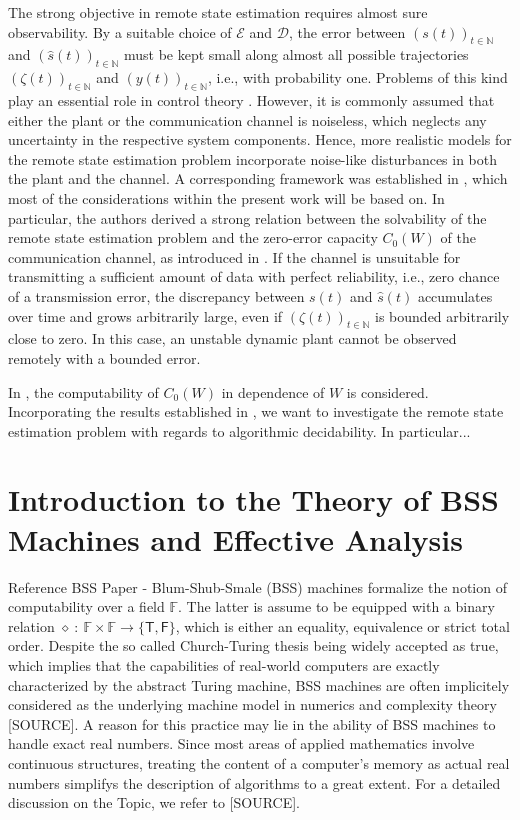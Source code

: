 \documentclass[conference]{IEEEtran}
\def\E{{\mathcal E}}
\def\D{{\mathcal D}}
\def\NN{{\mathbb N}}
\def\FF{{\mathbb F}}
\newcommand{\sdummy}{{\color{red}[SOURCE]}}
\begin{document}
	The strong objective in remote state estimation requires almost sure observability. By a suitable choice of \(\E\) and \(\D\), the error between \((s(t))_{t\in\NN}\)
	and \((\hat{s}(t))_{t\in\NN}\) must be kept small along almost all possible trajectories \((\zeta(t))_{t\in\NN}\) and \((y(t))_{t\in\NN}\), i.e., with probability one. 
	Problems of this kind play an essential role in control theory \cite{BL00, EM01, HOV02, IF02, HT05, HF02, L03, MS04, MS05, MS05a, MS05b, PS01, S06, SP03, TM04, TM04b, WB99}. 
	However, it is commonly assumed that either the plant or the communication channel is noiseless, which neglects any uncertainty in the respective system components. 
	Hence, more realistic models for the remote state estimation problem incorporate noise-like disturbances in both the plant and the channel. 
	A corresponding framework was established in \cite{MS07}, which most of the considerations within the present work will be based on.
	In particular, the authors derived a strong relation between the solvability of the remote state estimation problem and the zero-error capacity \(C_0(W)\) of the 
	communication channel, as introduced in \cite{S56}. If the channel is unsuitable for transmitting a sufficient amount of data with perfect reliability, i.e., zero 
	chance of a transmission error, the discrepancy between \(s(t)\) and \(\hat{s}(t)\) accumulates over time and grows arbitrarily large, even if \((\zeta(t))_{t\in\NN}\) 
	is bounded arbitrarily close to zero. In this case, an unstable dynamic plant cannot be observed remotely with a bounded error. 

	In \cite{BD20Z}, the computability of \(C_0(W)\) in dependence of \(W\) is considered. Incorporating the results established in \cite{BD20Z}, 
	we want to investigate the remote state estimation problem with regards to algorithmic decidability. In particular...

\section{Introduction to the Theory of BSS Machines and Effective Analysis}
	{\color{red} Reference BSS Paper - }
	Blum-Shub-Smale (BSS) machines formalize the notion of computability over a field \(\FF\). The latter is assume to be equipped 
	with a binary relation \(\diamond~{:}~\FF \times \FF \rightarrow \{\mathsf{T},\mathsf{F}\}\), which is either an equality, equivalence or strict total order. 
	Despite the so called Church-Turing thesis being widely accepted as true, which implies that the capabilities of real-world computers are exactly characterized 
	by the abstract Turing machine, BSS machines are often implicitely considered as the underlying machine model in numerics and complexity theory \sdummy. 
	A reason for this practice may lie in the ability of BSS machines to handle exact real numbers. Since most areas of applied mathematics involve continuous structures, 
	treating the content of a computer's memory as actual real numbers simplifys the description of algorithms to a great extent. For a detailed discussion on the Topic, we refer to \sdummy.
\end{document}

